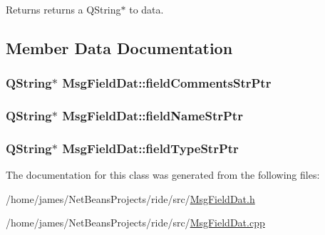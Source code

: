 \begin{DoxyReturn}{Returns}
returns a Q\-String$\ast$ to data. 
\end{DoxyReturn}


\subsection{Member Data Documentation}
\hypertarget{class_msg_field_dat_a837b0f0953bc4c697c9de2e262233ac3}{
\subsubsection[{field\-Comments\-Str\-Ptr}]{\setlength{\rightskip}{0pt plus 5cm}Q\-String$\ast$ Msg\-Field\-Dat\-::field\-Comments\-Str\-Ptr\hspace{0.3cm}{\ttfamily [private]}}}\label{class_msg_field_dat_a837b0f0953bc4c697c9de2e262233ac3}
\hypertarget{class_msg_field_dat_aa8d59c59c384ab7e489d35b35bdafcc0}{
\subsubsection[{field\-Name\-Str\-Ptr}]{\setlength{\rightskip}{0pt plus 5cm}Q\-String$\ast$ Msg\-Field\-Dat\-::field\-Name\-Str\-Ptr\hspace{0.3cm}{\ttfamily [private]}}}\label{class_msg_field_dat_aa8d59c59c384ab7e489d35b35bdafcc0}
\hypertarget{class_msg_field_dat_aeffe79541e1142808542de135916cc94}{
\subsubsection[{field\-Type\-Str\-Ptr}]{\setlength{\rightskip}{0pt plus 5cm}Q\-String$\ast$ Msg\-Field\-Dat\-::field\-Type\-Str\-Ptr\hspace{0.3cm}{\ttfamily [private]}}}\label{class_msg_field_dat_aeffe79541e1142808542de135916cc94}


The documentation for this class was generated from the following files\-:\begin{DoxyCompactItemize}
\item 
/home/james/\-Net\-Beans\-Projects/ride/src/\hyperlink{_msg_field_dat_8h}{Msg\-Field\-Dat.\-h}\item 
/home/james/\-Net\-Beans\-Projects/ride/src/\hyperlink{_msg_field_dat_8cpp}{Msg\-Field\-Dat.\-cpp}\end{DoxyCompactItemize}
